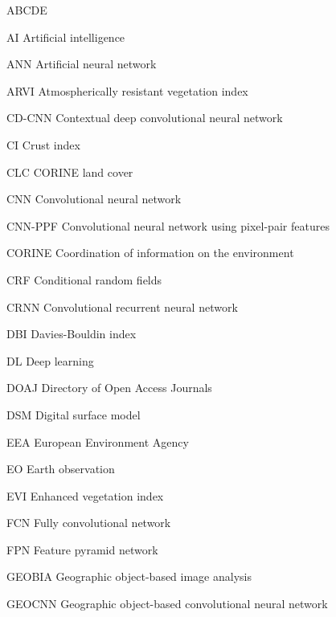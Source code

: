 
\begin{seznamzkratek}{ABCDE}

	      {AI}
	      {Artificial intelligence}

	      {ANN}
	      {Artificial neural network}

	      {ARVI}
	      {Atmospherically resistant vegetation index}

	      {CD-CNN}
	      {Contextual deep convolutional neural network}

	      {CI}
	      {Crust index}

	      {CLC}
	      {CORINE land cover}

	      {CNN}
	      {Convolutional neural network}

	      {CNN-PPF}
	      {Convolutional neural network using pixel-pair features}

	      {CORINE}
	      {Coordination of information on the environment}

	      {CRF}
	      {Conditional random fields}

	      {CRNN}
	      {Convolutional recurrent neural network}

	      {DBI}
	      {Davies-Bouldin index}

	      {DL}
	      {Deep learning}

	      {DOAJ}
	      {Directory of Open Access Journals}

	      {DSM}
	      {Digital surface model}

	      {EEA}
	      {European Environment Agency}

	      {EO}
	      {Earth observation}

	      {EVI}
	      {Enhanced vegetation index}

	      {FCN}
	      {Fully convolutional network}

	      {FPN}
	      {Feature pyramid network}

	      {GEOBIA}
	      {Geographic object-based image analysis}

	      {GEOCNN}
	      {Geographic object-based convolutional neural network}


\end{seznamzkratek}
